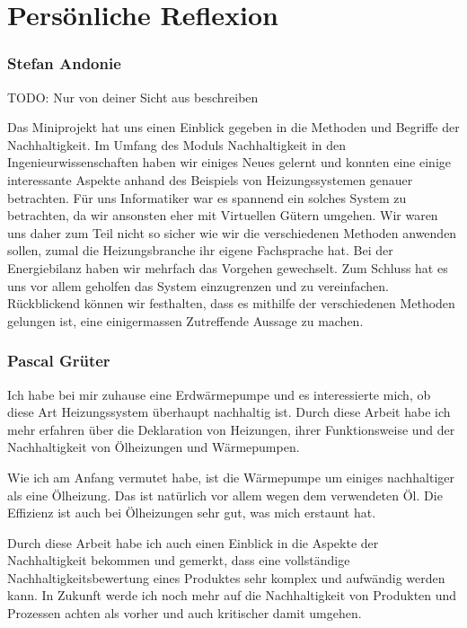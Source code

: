 \chapter{Persönliche Reflexion}
\label{chap:reflexion}

\subsection{Stefan Andonie}

TODO: Nur von deiner Sicht aus beschreiben

Das Miniprojekt hat uns einen Einblick gegeben in die Methoden und Begriffe
der Nachhaltigkeit.
Im Umfang des Moduls Nachhaltigkeit in den Ingenieurwissenschaften haben wir
einiges Neues gelernt und konnten eine einige interessante Aspekte anhand
des Beispiels von Heizungssystemen genauer betrachten.
Für uns Informatiker war es spannend ein solches System zu betrachten, da wir
ansonsten eher mit Virtuellen Gütern umgehen.
Wir waren uns daher zum Teil nicht so sicher wie wir die verschiedenen Methoden
anwenden sollen, zumal die Heizungsbranche ihr eigene Fachsprache hat.
Bei der Energiebilanz haben wir mehrfach das Vorgehen gewechselt.
Zum Schluss hat es uns vor allem geholfen das System einzugrenzen und zu
vereinfachen.
Rückblickend können wir festhalten, dass es mithilfe der verschiedenen Methoden
gelungen ist, eine einigermassen Zutreffende Aussage zu machen.

\subsection{Pascal Grüter}

Ich habe bei mir zuhause eine Erdwärmepumpe und es interessierte mich, ob diese Art Heizungssystem überhaupt nachhaltig ist. Durch diese Arbeit habe ich mehr erfahren über die Deklaration von Heizungen, ihrer Funktionsweise und der Nachhaltigkeit von Ölheizungen und Wärmepumpen.

Wie ich am Anfang vermutet habe, ist die Wärmepumpe um einiges nachhaltiger als eine Ölheizung. Das ist natürlich vor allem wegen dem verwendeten Öl. Die Effizienz ist auch bei Ölheizungen sehr gut, was mich erstaunt hat.

Durch diese Arbeit habe ich auch einen Einblick in die Aspekte der Nachhaltigkeit bekommen und gemerkt, dass eine vollständige Nachhaltigkeitsbewertung eines Produktes sehr komplex und aufwändig werden kann.
In Zukunft werde ich noch mehr auf die Nachhaltigkeit von Produkten und Prozessen achten als vorher und auch kritischer damit umgehen.